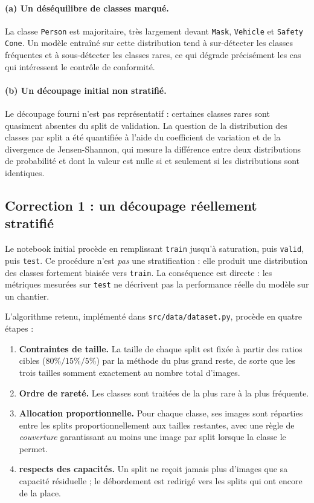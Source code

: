 \documentclass[11pt,a4paper]{article}
\begin{document}
\paragraph{(a) Un déséquilibre de classes marqué.} La classe
\texttt{Person} est majoritaire, très largement devant \texttt{Mask},
\texttt{Vehicle} et \texttt{Safety Cone}. Un modèle entraîné sur cette
distribution tend à sur-détecter les classes fréquentes et à sous-détecter
les classes rares, ce qui dégrade précisément les cas qui intéressent le
contrôle de conformité.

\paragraph{(b) Un découpage initial non stratifié.} Le découpage fourni
n'est pas représentatif : certaines classes rares sont quasiment absentes
du split de validation. La question de la distribution des classes par
split a été quantifiée à l'aide du coefficient de variation et de la
divergence de Jensen-Shannon, qui mesure la différence entre deux
distributions de probabilité et dont la valeur est nulle si et seulement si
les distributions sont identiques.

\subsection{Correction 1 : un découpage réellement stratifié}
\label{sec:strat}

Le notebook initial procède en remplissant \texttt{train} jusqu'à
saturation, puis \texttt{valid}, puis \texttt{test}. Ce procédure n'est
\emph{pas} une stratification : elle produit une distribution des classes
fortement biaisée vers \texttt{train}. La conséquence est directe : les
métriques mesurées sur \texttt{test} ne décrivent pas la performance réelle
du modèle sur un chantier.

L'algorithme retenu, implémenté dans \texttt{src/data/dataset.py}, procède
en quatre étapes :

\begin{enumerate}[leftmargin=1.4em]
  \item \textbf{Contraintes de taille.} La taille de chaque split est fixée
        à partir des ratios cibles (\(80\%/15\%/5\%\)) par la méthode du
        plus grand reste, de sorte que les trois tailles somment exactement
        au nombre total d'images.
  \item \textbf{Ordre de rareté.} Les classes sont traitées de la plus rare
        à la plus fréquente.
  \item \textbf{Allocation proportionnelle.} Pour chaque classe, ses images
        sont réparties entre les splits proportionnellement aux tailles
        restantes, avec une règle de \emph{couverture} garantissant au moins
        une image par split lorsque la classe le permet.
  \item \textbf{ respects des capacités.} Un split ne reçoit jamais plus
        d'images que sa capacité résiduelle ; le débordement est redirigé
        vers les splits qui ont encore de la place.
\end{enumerate}
\end{document}
